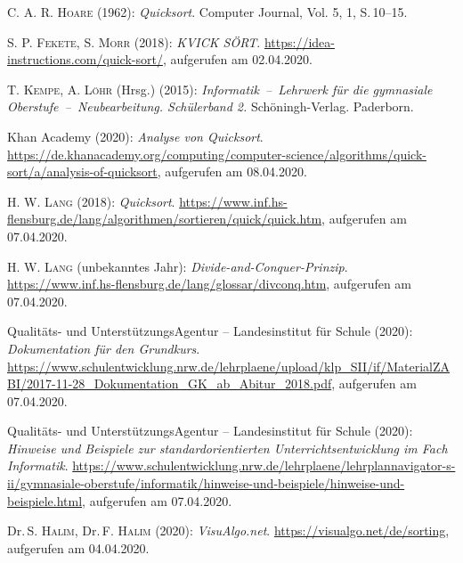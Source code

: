\documentclass[11pt, a4paper, oneside, openright]{article}
\newcommand \Seite{S.\,}
\begin{document}
\newpage
{}
{}
\renewcommand{\refname}{\bibname}
\begin{thebibliography}{50}

     C. A. R. \textsc{Hoare} (1962): \emph{Quicksort}. Computer Journal, Vol. 5, 1, \Seite 10--15.
    
     S. P. \textsc{Fekete}, S. \textsc{Morr} (2018): \emph{KVICK SÖRT}. \url{https://idea-instructions.com/quick-sort/}, aufgerufen am 02.04.2020.

     T. \textsc{Kempe},  A. \textsc{Löhr} (Hrsg.) (2015): \emph{Informatik~--~Lehrwerk für die gymnasiale Oberstufe~--~Neubearbeitung. Schülerband 2.} Schöningh-Verlag. Paderborn.
    
     Khan Academy (2020): \emph{Analyse von Quicksort}. \url{https://de.khanacademy.org/computing/computer-science/algorithms/quick-sort/a/analysis-of-quicksort}, aufgerufen am 08.04.2020.
    
     H. W. \textsc{Lang} (2018): \emph{Quicksort}. \url{https://www.inf.hs-flensburg.de/lang/algorithmen/sortieren/quick/quick.htm}, aufgerufen am 07.04.2020.
    
     H. W. \textsc{Lang} (unbekanntes Jahr): \emph{Divide-and-Conquer-Prinzip}. \url{https://www.inf.hs-flensburg.de/lang/glossar/divconq.htm}, aufgerufen am 07.04.2020.
    
     Qualitäts- und UnterstützungsAgentur -- Landesinstitut für Schule (2020): \emph{Dokumentation für den Grundkurs}. \url{https://www.schulentwicklung.nrw.de/lehrplaene/upload/klp_SII/if/MaterialZABI/2017-11-28_Dokumentation_GK_ab_Abitur_2018.pdf}, aufgerufen am 07.04.2020.
    
     Qualitäts- und UnterstützungsAgentur -- Landesinstitut für Schule (2020): \emph{Hinweise und Beispiele zur standardorientierten Unterrichtsentwicklung im Fach Informatik}. \url{https://www.schulentwicklung.nrw.de/lehrplaene/lehrplannavigator-s-ii/gymnasiale-oberstufe/informatik/hinweise-und-beispiele/hinweise-und-beispiele.html}, aufgerufen am 07.04.2020.
    
     Dr.\,S. \textsc{Halim}, Dr.\,F. \textsc{Halim} (2020): \emph{VisuAlgo.net}. \url{https://visualgo.net/de/sorting}, aufgerufen am 04.04.2020.
    

\end{thebibliography}
\end{document}
